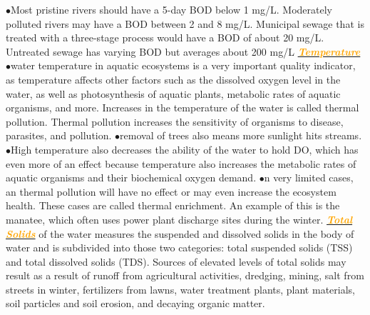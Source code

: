 \documentclass{article}
\newcommand{\ddd}{$\bullet$}
\newcommand{\orange}[1]{\textcolor{orange}{#1}}
\newcommand{\mysubsection}[1]{\underline{\textbf{{\textit{\orange{#1}}}}}}
\begin{document}
\begin{multicols*}{4}
            \ddd Most pristine rivers should have a 5-day BOD below 1 mg/L. Moderately polluted rivers may have a BOD between 2 and 8 mg/L. Municipal sewage that is treated with a three-stage process would have a BOD of about 20 mg/L. Untreated sewage has varying BOD but averages about 200 mg/L    
        \mysubsection{Temperature}
            \ddd water temperature in aquatic ecosystems is a very important quality indicator, as temperature affects other factors such as the dissolved oxygen level in the water, as well as photosynthesis of aquatic plants, metabolic rates of aquatic organisms, and more. Increases in the temperature of the water is called thermal pollution. Thermal pollution increases the sensitivity of organisms to disease, parasites, and pollution.
            \ddd removal of trees also means more sunlight hits streams. 
            \ddd  High temperature also decreases the ability of the water to hold DO, which has even more of an effect because temperature also increases the metabolic rates of aquatic organisms and their biochemical oxygen demand. 
            \ddd n very limited cases, an thermal pollution will have no effect or may even increase the ecosystem health. These cases are called thermal enrichment. An example of this is the manatee, which often uses power plant discharge sites during the winter.
        \mysubsection{Total Solids} of the water measures the suspended and dissolved solids in the body of water and is subdivided into those two categories: total suspended solids (TSS) and total dissolved solids (TDS). Sources of elevated levels of total solids may result as a result of runoff from agricultural activities, dredging, mining, salt from streets in winter, fertilizers from lawns, water treatment plants, plant materials, soil particles and soil erosion, and decaying organic matter.
        
\end{multicols*}
\end{document}

